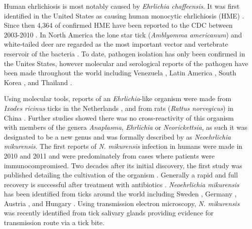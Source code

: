 \documentclass[a4paper, nobind]{templates/ociamthesis}
\begin{document}
Human ehrlichiosis is most notably caused by \emph{Ehrlichia chaffeensis}.
It was first identified in the United States as causing human monocytic ehrlichiosis (HME) \autocite{andersonEhrlichiaChaffeensisNew1991}.
Since then 4,364 of confirmed HME have been reported to the CDC between 2003-2010 \autocite{mmwrFinal2009Reports2010}.
In North America the lone star tick (\emph{Amblyomma americanum}) and white-tailed deer are regarded as the most important vector and vertebrate reservoir of the bacteria \autocite{rarAnaplasmaEhrlichiaCandidatus2011}.
To date, pathogen isolation has only been confirmed in the Unites States, however molecular and serological reports of the pathogen have been made throughout the world including Venezuela \autocite{martinezEhrlichiaChaffeensisChild2008}, Latin America \autocite{gongora-biachiFirstCaseHuman1999,dacostaMoreHumanMonocytotropic2006}, South Korea \autocite{parkDetectionAntibodiesAnaplasma2003}, and Thailand \autocite{heppnerHumanEhrlichiosisThailand1997}.

Using molecular tools, reports of an \emph{Ehrlichia}-like organism were made from \emph{Ixodes ricinus} ticks in the Netherlands \autocite{schoulsDetectionIdentificationEhrlichia1999}, and from rats (\emph{Rattus norvegicus}) in China \autocite{panEhrlichialikeOrganismGene2003}.
Further studies showed there was no cross-reactivity of this organism with members of the genera \emph{Anaplasma}, \emph{Ehrlichia} or \emph{Neorickettsia}, as such it was designated to be a new genus and was formally described by \textcite{kawaharaUltrastructurePhylogeneticAnalysis2004} as \emph{Neoehrlichia mikurensis}. The first reports of \emph{N. mikurensis} infection in humans were made in 2010 and 2011 \autocite{fehrSepticemiaCausedTickborne2010,vonloewenichDetectionCandidatusNeoehrlichia2010,welinder-olssonFirstCaseHuman2010,pekovaCandidatusNeoehrlichiaMikurensis2011} and were predominately from cases where patients were immunocompromised.
Two decades after its initial discovery, the first study was published detailing the cultivation of the organism \autocite{wassCultivationCausativeAgent2019}.
Generally a rapid and full recovery is successful after treatment with antibiotics \autocite{pekovaCandidatusNeoehrlichiaMikurensis2011}.
\emph{Neoehrlichia mikurensis} has been identified from ticks around the world including Sweden \autocite{anderssonCoinfectionCandidatusNeoehrlichia2013}, Germany \autocite{dinizCandidatusNeoehrlichiaMikurensis2011}, Austria \autocite{glatzDetectionCandidatusNeoehrlichia2014}, and Hungary \autocite{hornokMolecularAnalysisIxodes2017}.
Using transmission electron microscopy, \emph{N. mikurensis} was recently identified from tick salivary glands \autocite{ondrusPutativeMorphologyNeoehrlichia2020} providing evidence for transmission route via a tick bite.
\end{document}
